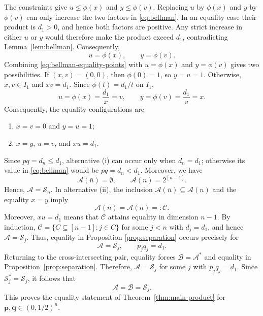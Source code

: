 \documentclass[11pt]{article}
\numberwithin{equation}{section}
\theoremstyle{definition}
\theoremstyle{remark}
\begin{document}
The constraints give
$
 u\leq\phi(x)
$
and 
$
 y\leq\phi(v).
$
Replacing $u$ by $\phi(x)$ and $y$ by $\phi(v)$ can only increase
the two factors in \eqref{eq:bellman}.  In an equality case their
product is $d_1>0$, and hence both factors are positive.  Any strict
increase in either $u$ or $y$ would therefore make the product exceed
$d_1$, contradicting Lemma~\ref{lem:bellman}.  Consequently,
$$
 u=\phi(x),
 \qquad
 y=\phi(v).
$$
Combining \eqref{eq:bellman-equality-points} with
$u=\phi(x)$ and $y=\phi(v)$ gives two possibilities.  If
$(x,v)=(0,0)$, then $\phi(0)=1$, so $y=u=1$.  Otherwise,
$x,v\in I_1$ and $xv=d_1$.  Since $\phi(t)=d_1/t$ on $I_1$,
\[
 u=\phi(x)=\frac{d_1}{x}=v,
 \qquad
 y=\phi(v)=\frac{d_1}{v}=x.
\]
Consequently, the equality configurations are
\begin{enumerate}[label=\textup{(\roman*)},leftmargin=2.2em]
 \item $x=v=0$ and $y=u=1$;
 \item $x=y$, $u=v$, and $xu=d_1$.
\end{enumerate}

Since $pq=d_n\leq d_1$, alternative \textup{(i)} can occur only when
$d_n=d_1$; otherwise its value in \eqref{eq:bellman} would be
$pq=d_n<d_1$.  Moreover, we have
$$
 \mathcal{A}(\bar n)=\emptyset,
 \qquad
 \mathcal{A}(n)=2^{[n-1]}.
$$
Hence, $\mathcal{A}=\mathcal{S}_n$.
In alternative \textup{(ii)}, the inclusion
$\mathcal{A}(\bar n)\subseteq\mathcal{A}(n)$ and the equality $x=y$
imply
$$
 \mathcal{A}(\bar n)=\mathcal{A}(n)=:\mathcal{C}.
$$
Moreover, $xu=d_1$ means that $\mathcal{C}$ attains equality in
dimension $n-1$.  By induction,
$\mathcal{C}=\{C\subseteq[n-1]:j\in C\}$ for some $j<n$ with $d_j=d_1$, and hence
$\mathcal{A}=\mathcal{S}_j$.  Thus, equality in
Proposition \ref{prop:separation} occurs precisely for
$$
 \mathcal{A}=\mathcal{S}_j,
 \qquad
 p_jq_j=d_1.
$$
Returning to the cross-intersecting pair, equality forces
$\mathcal{B}=\mathcal{A}^*$ and equality in
Proposition~\ref{prop:separation}.  Therefore,
$\mathcal{A}=\mathcal{S}_j$ for some $j$ with $p_jq_j=d_1$.
Since $\mathcal{S}_j^*=\mathcal{S}_j$, it follows that
$$
 \mathcal{A}=\mathcal{B}=\mathcal{S}_j.
$$
This proves the equality statement of
Theorem~\ref{thm:main-product} for
$\mathbf p,\mathbf q\in(0,1/2)^n$.
\end{document}

